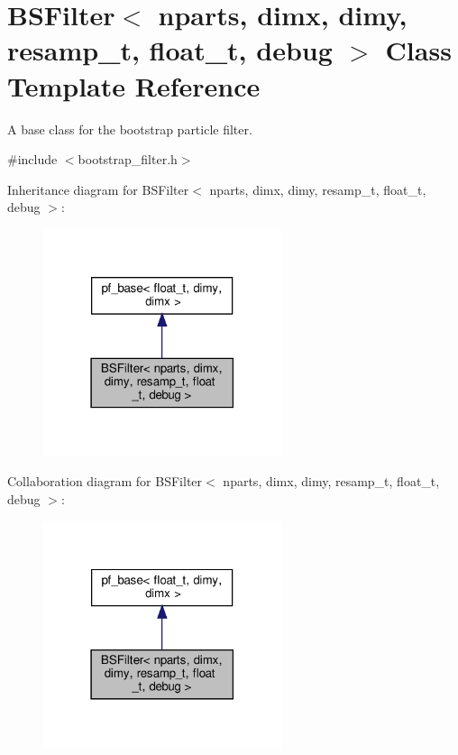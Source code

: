 \hypertarget{classBSFilter}{}\section{B\+S\+Filter$<$ nparts, dimx, dimy, resamp\+\_\+t, float\+\_\+t, debug $>$ Class Template Reference}
\label{classBSFilter}


A base class for the bootstrap particle filter.  




{\ttfamily \#include $<$bootstrap\+\_\+filter.\+h$>$}



Inheritance diagram for B\+S\+Filter$<$ nparts, dimx, dimy, resamp\+\_\+t, float\+\_\+t, debug $>$\+:
\nopagebreak
\begin{figure}[H]
\begin{center}
\leavevmode
\includegraphics[width=198pt]{classBSFilter__inherit__graph}
\end{center}
\end{figure}


Collaboration diagram for B\+S\+Filter$<$ nparts, dimx, dimy, resamp\+\_\+t, float\+\_\+t, debug $>$\+:
\nopagebreak
\begin{figure}[H]
\begin{center}
\leavevmode
\includegraphics[width=198pt]{classBSFilter__coll__graph}
\end{center}
\end{figure}
